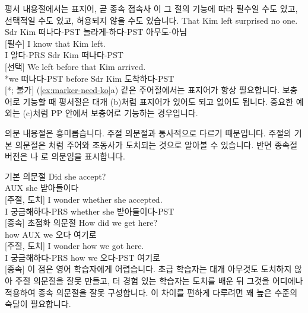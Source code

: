 평서 내용절에서는 표지어, 곧 종속 접속사 이 그 절의 기능에 따라 필수일 수도 있고, 선택적일 수도 있고, 허용되지 않을 수도 있습니다.
\ea\label{ex:marker-need-ko}
    \ea \gll That Kim left surprised no one.\\
        Sdr Kim 떠나다-PST 놀라게-하다-PST 아무도-아님\\
    \glt {} [필수]
    \ex \gll I know that Kim left.\\
        I 알다-PRS Sdr Kim 떠나다-PST\\
    \glt {} [선택]
    \ex \gll *We left before that Kim arrived.\\
        *we 떠나다-PST before Sdr Kim 도착하다-PST\\
    \glt {} [*; 불가]
\z
\z
(\ref{ex:marker-need-ko}a) 같은 주어절에서는 표지어가 항상 필요합니다. 보충어로 기능할 때 평서절은 대개 (b)처럼 표지어가 있어도 되고 없어도 됩니다. 중요한 예외는 (c)처럼 PP 안에서 보충어로 기능하는 경우입니다.

\label{sec:sub-interrog-ko}

의문 내용절은 흥미롭습니다. 주절 의문절과 통사적으로 다르기 때문입니다. 주절의 기본 의문절은 처럼 주어와 조동사가 도치되는 것으로 알아볼 수 있습니다. 반면 종속절 버전은 나 로 의문임을 표시합니다.

\ea 기본 의문절\label{ex:int-sub-ko}
    \ea \gll Did she accept?\\
        AUX she 받아들이다\\
    \glt {} [주절, 도치]
    \ex \gll I wonder {\ob}whether she accepted{\cb}.\\
        I 궁금해하다-PRS whether she 받아들이다-PST\\
    \glt {} [종속]
    \z
\z
\ea 초점화 의문절
    \ea \gll How did we get here?\\
        how AUX we 오다 여기로\\
    \glt {} [주절, 도치]
    \ex \gll I wonder {\ob}how we got here{\cb}.\\
        I 궁금해하다-PRS how we 오다-PST 여기로\\
    \glt {} [종속]
    \z
\z
이 점은 영어 학습자에게 어렵습니다. 초급 학습자는 대개 아무것도 도치하지 않아 주절 의문절을 잘못 만들고, 더 경험 있는 학습자는 도치를 배운 뒤 그것을 어디에나 적용하여 종속 의문절을 잘못 구성합니다. 이 차이를 편하게 다루려면 꽤 높은 수준의 숙달이 필요합니다.

